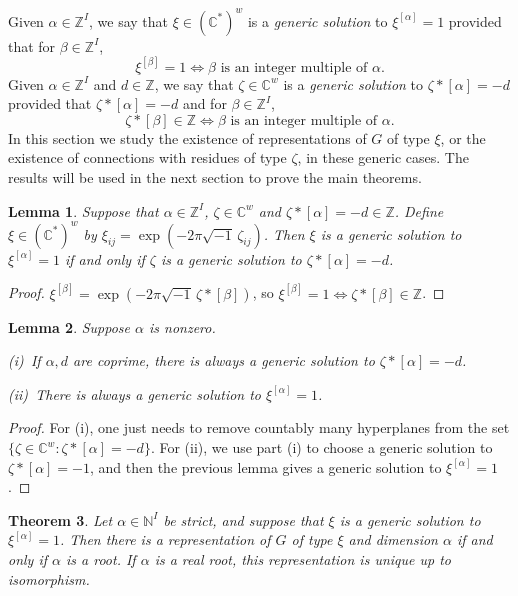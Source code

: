\documentclass{amsart}
\theoremstyle{plain}
\newtheorem{thm}{Theorem}[section]
\newtheorem{lem}[thm]{Lemma}
\theoremstyle{definition}
\theoremstyle{remark}
\newcommand{\C}{\mathbb{C}}
\newcommand{\Z}{\mathbb{Z}}
\newcommand{\N}{\mathbb{N}}
\begin{document}
Given $\alpha\in\Z^I$,
we say that $\xi\in(\C^*)^w$ is a \emph{generic solution}
to $\xi^{[\alpha]}=1$
provided that for $\beta\in\Z^I$,
\[
\xi^{[\beta]}=1
\Leftrightarrow
\text{$\beta$ is an integer multiple of $\alpha$.}
\]
Given $\alpha\in\Z^I$ and $d\in\Z$,
we say that $\zeta\in\C^w$ is a \emph{generic solution} to $\zeta*[\alpha]=-d$
provided that $\zeta*[\alpha]=-d$ and for $\beta\in\Z^I$,
\[
\zeta*[\beta]\in\Z
\Leftrightarrow
\text{$\beta$ is an integer multiple of $\alpha$.}
\]
In this section we study the existence of representations of $G$ of type $\xi$,
or the existence of connections with residues of type $\zeta$, in these
generic cases. The results will be used in the next section to prove the
main theorems.


\begin{lem}\label{l:gensols}
Suppose that $\alpha\in\Z^I$, $\zeta\in\C^w$ and
$\zeta*[\alpha]=-d\in\Z$. Define $\xi\in(\C^*)^w$ by
$\xi_{ij}=\exp(-2\pi\sqrt{-1}\, \zeta_{ij})$.
Then
$\xi$ is a generic solution to $\xi^{[\alpha]}=1$
if and only if
$\zeta$ is a generic solution to $\zeta*[\alpha]=-d$.
\end{lem}


\begin{proof}
$\xi^{[\beta]} = \exp(-2\pi\sqrt{-1}\, \zeta*[\beta])$, so
$\xi^{[\beta]} = 1\Leftrightarrow\zeta*[\beta]\in\Z$.
\end{proof}


\begin{lem}\label{l:gensolexist}
Suppose $\alpha$ is nonzero.

\textup{\hphantom{i}(i)}~If $\alpha,d$ are coprime,
there is always a generic solution to $\zeta*[\alpha]=-d$.

\textup{(ii)}~There is always a generic solution to $\xi^{[\alpha]}=1$.
\end{lem}


\begin{proof}
For (i), one just needs to remove countably many hyperplanes from
the set $\{ \zeta\in\C^w : \zeta*[\alpha]=-d\}$. For (ii), we use part (i) to
choose a generic solution to $\zeta*[\alpha] = -1$, and then
the previous lemma gives a generic solution to $\xi^{[\alpha]}=1$.
\end{proof}


\begin{thm}\label{t:gencase}
Let $\alpha\in\N^I$ be strict, and suppose
that $\xi$ is a generic solution to $\xi^{[\alpha]}=1$.
Then there is a representation of $G$ of type $\xi$ and dimension $\alpha$
if and only if $\alpha$ is a root. If $\alpha$ is a real root,
this representation is unique up to isomorphism.
\end{thm}
\end{document}
